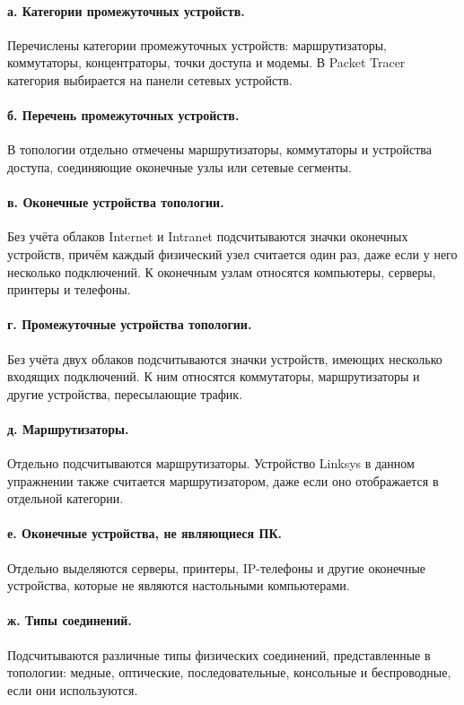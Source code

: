 \documentclass[a4paper,14pt,oneside]{extarticle}
\begin{document}
\paragraph{а. Категории промежуточных устройств.}
Перечислены категории промежуточных устройств: маршрутизаторы,
коммутаторы, концентраторы, точки доступа и модемы. В Packet Tracer
категория выбирается на панели сетевых устройств.

\paragraph{б. Перечень промежуточных устройств.}
В топологии отдельно отмечены маршрутизаторы, коммутаторы и устройства
доступа, соединяющие оконечные узлы или сетевые сегменты.

\paragraph{в. Оконечные устройства топологии.}
Без учёта облаков Internet и Intranet подсчитываются значки оконечных
устройств, причём каждый физический узел считается один раз, даже если у
него несколько подключений. К оконечным узлам относятся компьютеры,
серверы, принтеры и телефоны.

\paragraph{г. Промежуточные устройства топологии.}
Без учёта двух облаков подсчитываются значки устройств, имеющих несколько
входящих подключений. К ним относятся коммутаторы, маршрутизаторы и
другие устройства, пересылающие трафик.

\paragraph{д. Маршрутизаторы.}
Отдельно подсчитываются маршрутизаторы. Устройство Linksys в данном
упражнении также считается маршрутизатором, даже если оно отображается
в отдельной категории.

\paragraph{е. Оконечные устройства, не являющиеся ПК.}
Отдельно выделяются серверы, принтеры, IP-телефоны и другие оконечные
устройства, которые не являются настольными компьютерами.

\paragraph{ж. Типы соединений.}
Подсчитываются различные типы физических соединений, представленные в
топологии: медные, оптические, последовательные, консольные и
беспроводные, если они используются.
\end{document}
